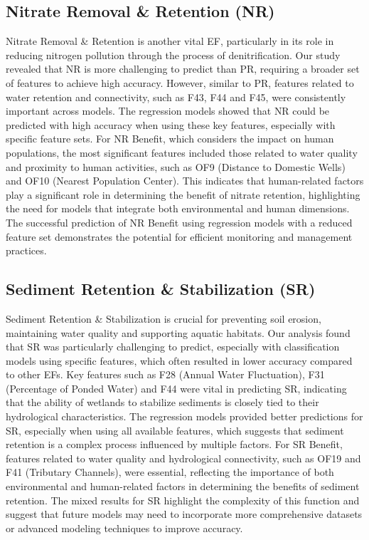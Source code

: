 \documentclass[12pt,letterpaper]{article}
\begin{document}
\subsection{Nitrate Removal \& Retention (\ac{NR})}
Nitrate Removal \& Retention is another vital \ac{EF}, particularly in its role in reducing nitrogen pollution through the process of denitrification.
Our study revealed that \ac{NR} is more challenging to predict than \ac{PR}, requiring a broader set of features to achieve high accuracy.
However, similar to \ac{PR}, features related to water retention and connectivity, such as F43, F44 and F45, were consistently important across models.
The regression models showed that \ac{NR} could be predicted with high accuracy when using these key features, especially with specific feature sets.
For \ac{NR} Benefit, which considers the impact on human populations, the most significant features included those related to water quality and proximity to human activities, such as OF9 (Distance to Domestic Wells) and OF10 (Nearest Population Center).
This indicates that human-related factors play a significant role in determining the benefit of nitrate retention, highlighting the need for models that integrate both environmental and human dimensions.
The successful prediction of \ac{NR} Benefit using regression models with a reduced feature set demonstrates the potential for efficient monitoring and management practices.

\subsection{Sediment Retention \& Stabilization (\ac{SR})}
Sediment Retention \& Stabilization is crucial for preventing soil erosion, maintaining water quality and supporting aquatic habitats.
Our analysis found that \ac{SR} was particularly challenging to predict, especially with classification models using specific features, which often resulted in lower accuracy compared to other \acp{EF}.
Key features such as F28 (Annual Water Fluctuation), F31 (Percentage of Ponded Water) and F44 were vital in predicting \ac{SR}, indicating that the ability of wetlands to stabilize sediments is closely tied to their hydrological characteristics.
The regression models provided better predictions for \ac{SR}, especially when using all available features, which suggests that sediment retention is a complex process influenced by multiple factors.
For \ac{SR} Benefit, features related to water quality and hydrological connectivity, such as OF19 and F41 (Tributary Channels), were essential, reflecting the importance of both environmental and human-related factors in determining the benefits of sediment retention.
The mixed results for \ac{SR} highlight the complexity of this function and suggest that future models may need to incorporate more comprehensive datasets or advanced modeling techniques to improve accuracy.
\end{document}
